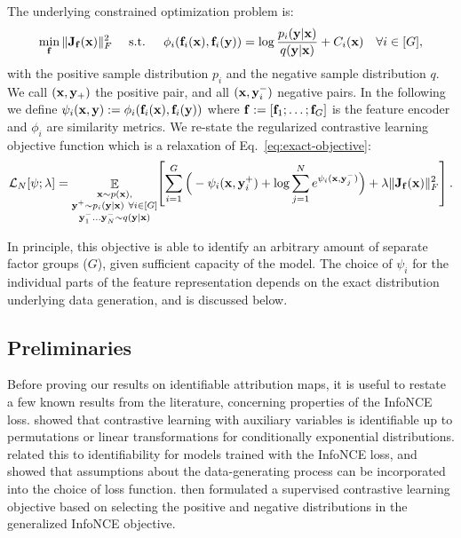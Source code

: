     The underlying constrained optimization problem is:
    \begin{equation}
        \min_{\mathbf{f}} \| \mathbf{J}_{\mathbf{f}}(\mathbf{x}) \|_F^2
        \quad
        \text{ s.t. }
        \quad
        \phi_i(\mathbf{f}_i(\mathbf{x}), \mathbf{f}_i(\mathbf{y})) = \log \frac{p_i(\mathbf{y} | \mathbf{x})}{q(\mathbf{y} | \mathbf{x})} + C_i(\mathbf{x}) \quad \forall i \in [G],
        \label{eq:exact-objective}
    \end{equation}
    with the positive sample distribution $p_i$ and the negative sample distribution $q$. We call $(\mathbf{x}, \mathbf{y}_+)$ the positive pair, and all $(\mathbf{x}, \mathbf{y}^-_i)$ negative pairs. 
    In the following we define $\psi_i(\mathbf{x}, \mathbf{y}) := \phi_i(\mathbf{f}_i(\mathbf{x}), \mathbf{f}_i(\mathbf{y}))$ where $\mathbf{f} := [\mathbf{f}_1; \dots; \mathbf{f}_G]$ is the feature encoder and $\phi_i$ are similarity metrics.
    We re-state the regularized contrastive learning objective function which is a relaxation of Eq.~\ref{eq:exact-objective}:
    \begin{equation}
        \mathcal L_N[\psi; \lambda] = \mathop{\mathbb{E}}\limits_{{\substack{
            \mathbf{x} \sim p(\mathbf{x}),\\ 
            \mathbf{y}^+ \sim p_i(\mathbf{y}|\mathbf{x}) \ \forall i\in[G]\\
            \mathbf{y}^-_1\dots\mathbf{y}^-_N \sim q(\mathbf{y}|\mathbf{x})\\
        }}}
        \hspace{-.25em}
        \left[ \sum_{i=1}^{G} \Big( - \psi_i(\mathbf{x}, \mathbf{y}^+_i)
        +  \log \sum_{j=1}^{N} e^{\psi_i(\mathbf{x}, \mathbf{y}^-_j)} \Big)
        + 
        \lambda \| \mathbf{J}_{\mathbf{f}}(\mathbf{x}) \|_F^2
        \right].
    \end{equation}
    
    In principle, this objective is able to identify an arbitrary amount of separate factor groups ($G$), given sufficient capacity of the model.
    The choice of $\psi_i$ for the individual parts of the feature representation depends on the exact distribution underlying data generation, and is discussed below.

\subsection{Preliminaries}
\label{label:prelims-part2}
    Before proving our results on identifiable attribution maps, it is useful to restate a few known results from the literature, concerning properties of the InfoNCE loss.
    \citet{hyvarinen2019nonlinear} showed that contrastive learning with auxiliary variables is identifiable up to permutations or linear transformations for conditionally exponential distributions. \citet{zimmermann2021contrastive} related this to identifiability for models trained with the InfoNCE loss, and showed that assumptions about the data-generating process can be incorporated into the choice of loss function.
    \citet{schneider2023cebra} then formulated a supervised contrastive learning objective based on selecting the positive and negative distributions in the generalized InfoNCE objective.

